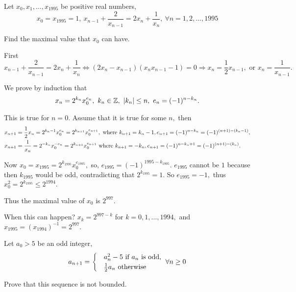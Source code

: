 \documentclass{article}
\begin{document}
\begin{problem}
    Let $x_0, x_1, \ldots, x_{1995}$ be positive real numbers,
    \[ 
        x_0 = x_{1995} = 1,\ x_{n-1} +\frac{2}{x_{n-1}} = 2x_n + \frac{1}{x_n}, \ \forall n=1,2,\ldots,1995
    \]

    Find the maximal value that $x_0$ can have.
\end{problem}

\begin{soln}
    First 
    \[
        x_{n-1} +\frac{2}{x_{n-1}} = 2x_n + \frac{1}{x_n} \Leftrightarrow (2x_n - x_{n-1})(x_{n} x_{n-1} -1) = 0
        \Rightarrow x_n = \frac{1}{2} x_{n-1}, \text{\ or\ } x_n = \frac{1}{x_{n-1}}.
    \]

    We prove by induction that 
    \[
        x_n = 2^{k_n}x_0^{e_n},\ k_n \in \mathbb Z,\ |k_n| \le n,\ e_n = (-1)^{n-k_n}.
    \]

    This is true for $n=0.$ Assume that it is true for some $n,$ then
    \[
        \begin{aligned}
            &x_{n+1} = \frac{1}{2} x_n = 2^{k_n-1}x_0^{e_n} = 2^{k_{n+1}} x_0^{e_{n+1}},\
            \text{where}\ k_{n+1} = k_n-1, e_{n+1} = (-1)^{n-k_n} = (-1)^{(n+1)-(k_n-1)},\\
            &x_{n+1} = \frac{1}{x_n} = 2^{-k_n} x_0^{-e_n} = 2^{k_{n+1}} x_0^{e_{n+1}}
            \ \text{where}\ k_{n+1} = -k_n, e_{n+1} = (-1)^{n-k_n+1} = (-1)^{(n+1)-(k_n)}.\\
        \end{aligned}
    \]

    Now $x_ 0 = x_{1995} = 2^{k_{1995}} x_0^{e_{1995}},$ so, $e_{1995} = (-1)^{1995 - k_{1995}}.$
    $e_{1995}$ cannot be $1$ because then $k_{1995}$ would be odd, contradicting that $2^{k_{1995}} = 1.$
    So $e_{1995} = -1,$ thus $x_0^2 = 2^{k_{1995}} \le 2^{1994}.$

    Thus the maximal value of $x_0$ is $\boxed{2^{997}.}$
     
    When this can happen? $x_k = 2^{997-k}$ for $k=0,1,\ldots, 1994,$ and $x_{1995} = (x_{1994})^{-1} = 2^{997}.$
\end{soln}

\begin{problem}
    Let $a_0 > 5$ be an odd integer,
    \[ 
        a_{n+1} = 
        \begin{cases}
            &a_n^2 - 5 \text{\ if\ } a_n \text{\ is odd},\\
            &\frac{1}{2} a_n \text{\ otherwise}
        \end{cases}
        \ \forall n\ge 0
    \]

    Prove that this sequence is not bounded.
\end{problem}
\end{document}
